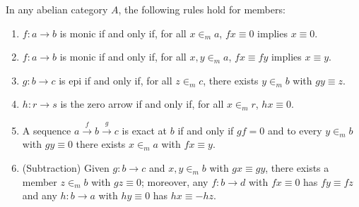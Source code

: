 In any abelian category $A$, the following rules hold for members:

\begin{enumerate}
\item[(i)] $f : a \rightarrow b$ is monic if and only if, for all $x \in_m a$, $f x \equiv 0$ implies $x \equiv 0$.
\item[(ii)] $f : a \rightarrow b$ is monic if and only if, for all $x, y \in_m a$, $f x \equiv f y$ implies $x \equiv y$.
\item[(iii)] $g : b \rightarrow c$ is epi if and only if, for all $z \in_m c$, there exists $y \in_m b$ with $g y \equiv z$.
\item[(iv)] $h : r \rightarrow s$ is the zero arrow if and only if, for all $x \in_m r$, $h x \equiv 0$.
\item[(v)] A sequence $a \xrightarrow{f} b \xrightarrow{g} c$ is exact at $b$ if and only if $g f = 0$ and to every $y \in_m b$ with $g y \equiv 0$ there exists $x \in_m a$ with $f x \equiv y$.
\item[(vi)] (Subtraction) Given $g : b \rightarrow c$ and $x, y \in_m b$ with $g x \equiv g y$, there exists a member $z \in_m b$ with $g z \equiv 0$; moreover, any $f : b \rightarrow d$ with $f x \equiv 0$ has $f y \equiv f z$ and any $h : b \rightarrow a$ with $h y \equiv 0$ has $h x \equiv -h z$.
\end{enumerate}
